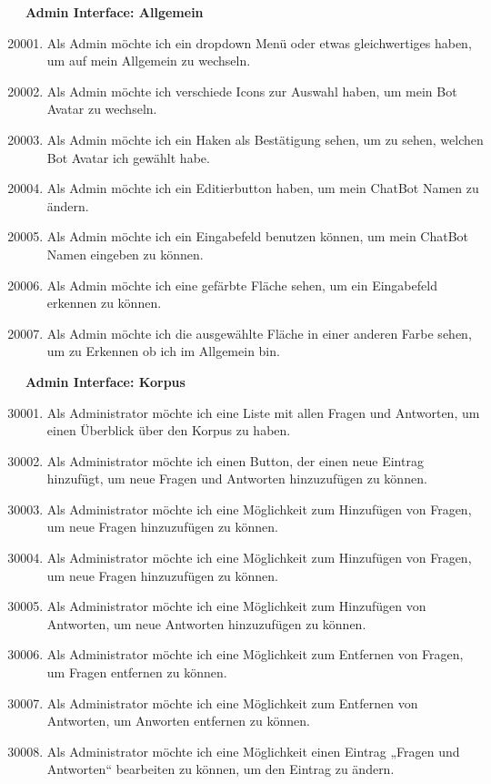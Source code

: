 \textbf{Admin Interface: Allgemein}
\begin{enumerate}[leftmargin=*,labelindent=40pt,label=u\arabic*.]
    \setcounter{enumi}{20000}
    \item Als Admin möchte ich ein dropdown Menü oder etwas gleichwertiges haben, um auf mein Allgemein zu wechseln. 
    \item Als Admin möchte ich verschiede Icons zur Auswahl haben, um mein Bot Avatar zu wechseln. 
    \item Als Admin möchte ich ein Haken als Bestätigung sehen, um zu sehen, welchen Bot Avatar ich gewählt habe. 
    \item Als Admin möchte ich ein Editierbutton haben, um mein ChatBot Namen zu ändern. 
    \item Als Admin möchte ich ein Eingabefeld benutzen können, um mein ChatBot Namen eingeben zu können. 
    \item Als Admin möchte ich eine gefärbte Fläche sehen, um ein Eingabefeld erkennen zu können. 
    \item Als Admin möchte ich die ausgewählte Fläche in einer anderen Farbe sehen, um zu Erkennen ob ich im Allgemein bin. 
\end{enumerate}

\textbf{Admin Interface: Korpus}
\begin{enumerate}[leftmargin=*,labelindent=40pt,label=u\arabic*.]
    \setcounter{enumi}{30000}
    \item Als Administrator möchte ich eine Liste mit allen Fragen und Antworten, um einen Überblick über den Korpus zu haben.
    \item Als Administrator möchte ich einen Button, der einen neue Eintrag hinzufügt, um neue Fragen und Antworten hinzuzufügen zu können.
    \item Als Administrator möchte ich eine Möglichkeit zum Hinzufügen von Fragen, um neue Fragen hinzuzufügen zu können.
    \item Als Administrator möchte ich eine Möglichkeit zum Hinzufügen von Fragen, um neue Fragen hinzuzufügen zu können.
    \item Als Administrator möchte ich eine Möglichkeit zum Hinzufügen von Antworten, um neue Antworten hinzuzufügen zu können.
    \item Als Administrator möchte ich eine Möglichkeit zum Entfernen von Fragen, um Fragen entfernen zu können.
    \item Als Administrator möchte ich eine Möglichkeit zum Entfernen von Antworten, um Anworten entfernen zu können.
    \item Als Administrator möchte ich eine Möglichkeit einen Eintrag „Fragen und Antworten“ bearbeiten zu können, um den Eintrag zu ändern.
\end{enumerate}

